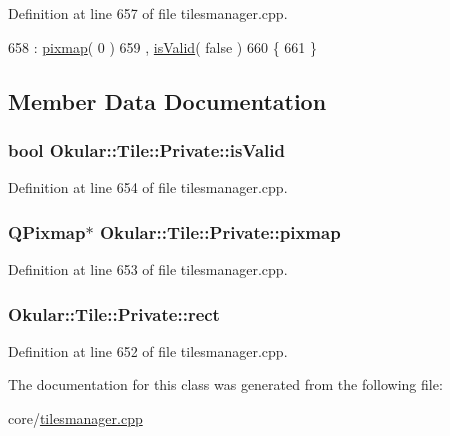 Definition at line 657 of file tilesmanager.\+cpp.


\begin{DoxyCode}
658     : \hyperlink{classTile_1_1Private_a95ad86a2c4ac72a56a341e6d51601c8c}{pixmap}( 0 )
659     , \hyperlink{classTile_1_1Private_a43bf584b73655c8551f28f37149edda8}{isValid}( \textcolor{keyword}{false} )
660 \{
661 \}
\end{DoxyCode}


\subsection{Member Data Documentation}
\hypertarget{classTile_1_1Private_a43bf584b73655c8551f28f37149edda8}{
\subsubsection[{is\+Valid}]{\setlength{\rightskip}{0pt plus 5cm}bool Okular\+::\+Tile\+::\+Private\+::is\+Valid}}\label{classTile_1_1Private_a43bf584b73655c8551f28f37149edda8}


Definition at line 654 of file tilesmanager.\+cpp.

\hypertarget{classTile_1_1Private_a95ad86a2c4ac72a56a341e6d51601c8c}{
\subsubsection[{pixmap}]{\setlength{\rightskip}{0pt plus 5cm}Q\+Pixmap$\ast$ Okular\+::\+Tile\+::\+Private\+::pixmap}}\label{classTile_1_1Private_a95ad86a2c4ac72a56a341e6d51601c8c}


Definition at line 653 of file tilesmanager.\+cpp.

\hypertarget{classTile_1_1Private_abf6d6cfce248984b03878a0db7a32be9}{
\subsubsection[{rect}]{ Okular\+::\+Tile\+::\+Private\+::rect}}\label{classTile_1_1Private_abf6d6cfce248984b03878a0db7a32be9}


Definition at line 652 of file tilesmanager.\+cpp.



The documentation for this class was generated from the following file\+:\begin{DoxyCompactItemize}
\item 
core/\hyperlink{tilesmanager_8cpp}{tilesmanager.\+cpp}\end{DoxyCompactItemize}
